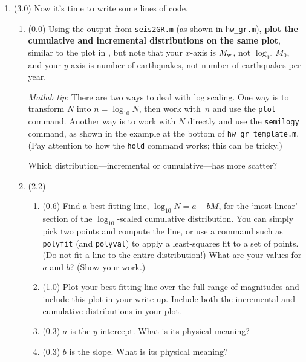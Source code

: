 \documentclass[11pt,titlepage,fleqn]{article}
\begin{document}
\begin{enumerate}
\begin{enumerate}
\end{enumerate}


\item (3.0) Now it's time to write some lines of code. 

\begin{enumerate}
\item (0.0) Using the output from \verb+seis2GR.m+ (as shown in \verb+hw_gr.m+), {\bf plot the cumulative and incremental distributions on the same plot}, similar to the plot in \citet[][Figure~4.7-2]{SteinWysession}, but note that your $x$-axis is $M_{\rm w}$, not $\log_{10} M_0$, and your $y$-axis is number of earthquakes, not number of earthquakes per year.

{\em Matlab tip}: There are two ways to deal with log scaling. One way is to transform $N$ into $n = \log_{10} N$, then work with~$n$ and use the \verb+plot+ command. Another way is to work with $N$ directly and use the \verb+semilogy+ command, as shown in the example at the bottom of \verb+hw_gr_template.m+. (Pay attention to how the \verb+hold+ command works; this can be tricky.)

Which distribution---incremental or cumulative---has more scatter?

\item (2.2)

\begin{enumerate}
\item (0.6) Find a best-fitting line, $\log_{10} N = a - b M$, for the `most linear' section of the $\log_{10}$-scaled cumulative distribution. You can simply pick two points and compute the line, or use a command such as \verb+polyfit+ (and \verb+polyval+) to apply a least-squares fit to a set of points. (Do not fit a line to the entire distribution!) What are your values for $a$ and $b$? (Show your work.)

\item (1.0) Plot your best-fitting line over the full range of magnitudes and include this plot in your write-up. Include both the incremental and cumulative distributions in your plot.

\item (0.3) $a$ is the $y$-intercept. What is its physical meaning?

\item (0.3) $b$ is the slope. What is its physical meaning?

\end{enumerate}


\end{enumerate}
\end{enumerate}
\end{document}
